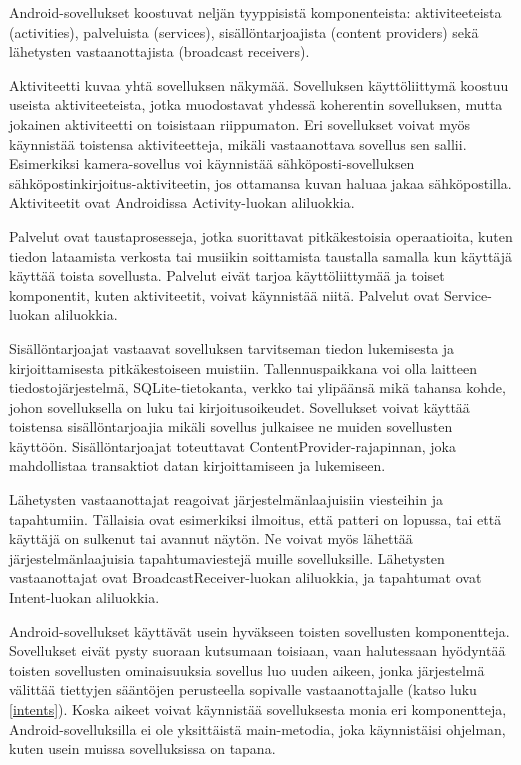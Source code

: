 Android-sovellukset koostuvat neljän tyyppisistä komponenteista: aktiviteeteista (activities), palveluista (services), sisällöntarjoajista (content providers) sekä lähetysten vastaanottajista (broadcast receivers).

Aktiviteetti kuvaa yhtä sovelluksen näkymää. Sovelluksen käyttöliittymä koostuu useista aktiviteeteista, jotka muodostavat yhdessä koherentin sovelluksen, mutta jokainen aktiviteetti on toisistaan riippumaton. Eri sovellukset voivat myös käynnistää toistensa aktiviteetteja, mikäli vastaanottava sovellus sen sallii. Esimerkiksi kamera-sovellus voi käynnistää sähköposti-sovelluksen sähköpostinkirjoitus-aktiviteetin, jos ottamansa kuvan haluaa jakaa sähköpostilla. Aktiviteetit ovat Androidissa Activity-luokan aliluokkia.

Palvelut ovat taustaprosesseja, jotka suorittavat pitkäkestoisia operaatioita, kuten tiedon lataamista verkosta tai musiikin soittamista taustalla samalla kun käyttäjä käyttää toista sovellusta. Palvelut eivät tarjoa käyttöliittymää ja toiset komponentit, kuten aktiviteetit, voivat käynnistää niitä. Palvelut ovat Service-luokan aliluokkia.

Sisällöntarjoajat vastaavat sovelluksen tarvitseman tiedon lukemisesta ja kirjoittamisesta pitkäkestoiseen muistiin. Tallennuspaikkana voi olla laitteen tiedostojärjestelmä, SQLite-tietokanta, verkko tai ylipäänsä mikä tahansa kohde, johon sovelluksella on luku tai kirjoitusoikeudet. Sovellukset voivat käyttää toistensa sisällöntarjoajia mikäli sovellus julkaisee ne muiden sovellusten käyttöön. Sisällöntarjoajat toteuttavat ContentProvider-rajapinnan, joka mahdollistaa transaktiot datan kirjoittamiseen ja lukemiseen.

Lähetysten vastaanottajat reagoivat järjestelmänlaajuisiin viesteihin ja tapahtumiin. Tällaisia ovat esimerkiksi ilmoitus, että patteri on lopussa, tai että käyttäjä on sulkenut tai avannut näytön. Ne voivat myös lähettää järjestelmänlaajuisia tapahtumaviestejä muille sovelluksille. Lähetysten vastaanottajat ovat BroadcastReceiver-luokan aliluokkia, ja tapahtumat ovat Intent-luokan aliluokkia.

Android-sovellukset käyttävät usein hyväkseen toisten sovellusten komponentteja. Sovellukset eivät pysty suoraan kutsumaan toisiaan, vaan halutessaan hyödyntää toisten sovellusten ominaisuuksia sovellus luo uuden aikeen, jonka järjestelmä välittää tiettyjen sääntöjen perusteella sopivalle vastaanottajalle (katso luku \ref{intents}). Koska aikeet voivat käynnistää sovelluksesta monia eri komponentteja, Android-sovelluksilla ei ole yksittäistä main-metodia, joka käynnistäisi ohjelman, kuten usein muissa sovelluksissa on tapana. \cite{android}

